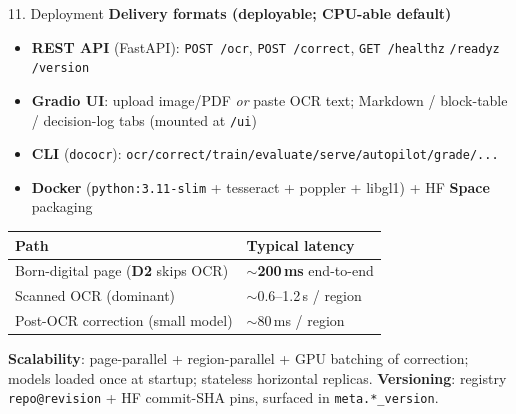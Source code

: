 \documentclass[10pt,aspectratio=169]{beamer}
\begin{document}
\begin{frame}{11. Deployment}
\textbf{Delivery formats (deployable; CPU-able default)}
\begin{itemize}\small
  \item \textbf{REST API} (FastAPI): \texttt{POST /ocr}, \texttt{POST /correct}, \texttt{GET /healthz} \texttt{/readyz} \texttt{/version}
  \item \textbf{Gradio UI}: upload image/PDF \emph{or} paste OCR text; Markdown / block-table / decision-log tabs (mounted at \texttt{/ui})
  \item \textbf{CLI} (\texttt{dococr}): \texttt{ocr/correct/train/evaluate/serve/autopilot/grade/...}
  \item \textbf{Docker} (\texttt{python:3.11-slim} + tesseract + poppler + libgl1) + HF \textbf{Space} packaging
\end{itemize}

\begin{table}[h]
\centering\scriptsize
\begin{tabular}{ll}
\toprule
\textbf{Path} & \textbf{Typical latency} \\
\midrule
Born-digital page (\textbf{D2} skips OCR) & $\sim$\textbf{200\,ms} end-to-end \\
Scanned OCR (dominant) & $\sim$0.6--1.2\,s / region \\
Post-OCR correction (small model) & $\sim$80\,ms / region \\
\bottomrule
\end{tabular}
\end{table}

\textbf{Scalability}: page-parallel + region-parallel + GPU batching of correction; models loaded once at startup; stateless horizontal replicas. \textbf{Versioning}: registry \texttt{repo@revision} + HF commit-SHA pins, surfaced in \texttt{meta.*\_version}.
\end{frame}
\end{document}
